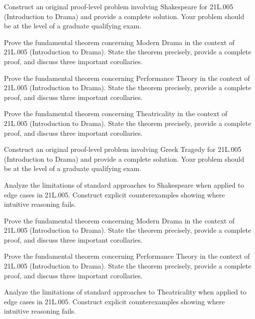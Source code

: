 \documentclass[12pt,a4paper]{exam}
\begin{document}
\begin{questions}
\vspace{0.3cm}

\question[3]
Construct an original proof-level problem involving Shakespeare for 21L.005 (Introduction to Drama) and provide a complete solution. Your problem should be at the level of a graduate qualifying exam.

\vspace{0.3cm}

\question[6]
Prove the fundamental theorem concerning Modern Drama in the context of 21L.005 (Introduction to Drama). State the theorem precisely, provide a complete proof, and discuss three important corollaries.

\vspace{0.3cm}

\question[6]
Prove the fundamental theorem concerning Performance Theory in the context of 21L.005 (Introduction to Drama). State the theorem precisely, provide a complete proof, and discuss three important corollaries.

\vspace{0.3cm}

\question[2]
Prove the fundamental theorem concerning Theatricality in the context of 21L.005 (Introduction to Drama). State the theorem precisely, provide a complete proof, and discuss three important corollaries.

\vspace{0.3cm}

\question[5]
Construct an original proof-level problem involving Greek Tragedy for 21L.005 (Introduction to Drama) and provide a complete solution. Your problem should be at the level of a graduate qualifying exam.

\vspace{0.3cm}

\question[3]
Analyze the limitations of standard approaches to Shakespeare when applied to edge cases in 21L.005. Construct explicit counterexamples showing where intuitive reasoning fails.

\vspace{0.3cm}

\question[5]
Prove the fundamental theorem concerning Modern Drama in the context of 21L.005 (Introduction to Drama). State the theorem precisely, provide a complete proof, and discuss three important corollaries.

\vspace{0.3cm}

\question[3]
Prove the fundamental theorem concerning Performance Theory in the context of 21L.005 (Introduction to Drama). State the theorem precisely, provide a complete proof, and discuss three important corollaries.

\vspace{0.3cm}

\question[4]
Analyze the limitations of standard approaches to Theatricality when applied to edge cases in 21L.005. Construct explicit counterexamples showing where intuitive reasoning fails.

\vspace{0.3cm}

\end{questions}
\end{document}
